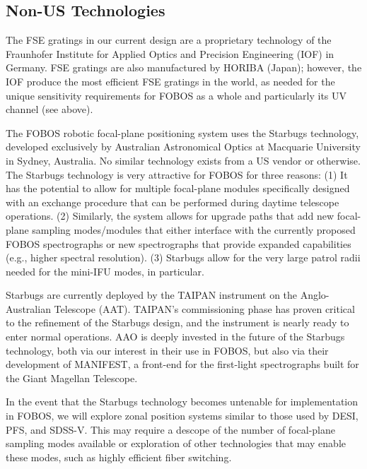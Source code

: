 \documentclass[oneside,11pt]{amsart}
\begin{document}

\subsection{Non-US Technologies}
\label{sec:starbugs}

The FSE gratings in our current design are a proprietary technology
of the Fraunhofer Institute for Applied Optics and Precision
Engineering (IOF) in Germany. FSE gratings are also manufactured by
HORIBA (Japan); however, the IOF produce the most efficient FSE
gratings in the world, as needed for the unique sensitivity
requirements for FOBOS as a whole and particularly its UV channel
(see above).

The FOBOS robotic focal-plane positioning system uses the Starbugs
technology, developed exclusively by Australian Astronomical Optics
at Macquarie University in Sydney, Australia. No similar technology
exists from a US vendor or otherwise. The Starbugs technology is very
attractive for FOBOS for three reasons: (1) It has the potential to
allow for multiple focal-plane modules specifically designed with an
exchange procedure that can be performed during daytime telescope
operations. (2) Similarly, the system allows for upgrade paths that
add new focal-plane sampling modes/modules that either interface with
the currently proposed FOBOS spectrographs or new spectrographs that
provide expanded capabilities (e.g., higher spectral resolution). (3)
Starbugs allow for the very large patrol radii needed for the
mini-IFU modes, in particular.

Starbugs are currently deployed by the TAIPAN instrument on the
Anglo-Australian Telescope (AAT). TAIPAN's commissioning phase has
proven critical to the refinement of the Starbugs design, and the
instrument is nearly ready to enter normal operations. AAO is deeply
invested in the future of the Starbugs technology, both via our
interest in their use in FOBOS, but also via their development of
MANIFEST, a front-end for the first-light spectrographs built for the
Giant Magellan Telescope.

In the event that the Starbugs technology becomes untenable for
implementation in FOBOS, we will explore zonal position systems
similar to those used by DESI, PFS, and SDSS-V. This may require a
descope of the number of focal-plane sampling modes available or
exploration of other technologies that may enable these modes, such
as highly efficient fiber switching.
\end{document}
